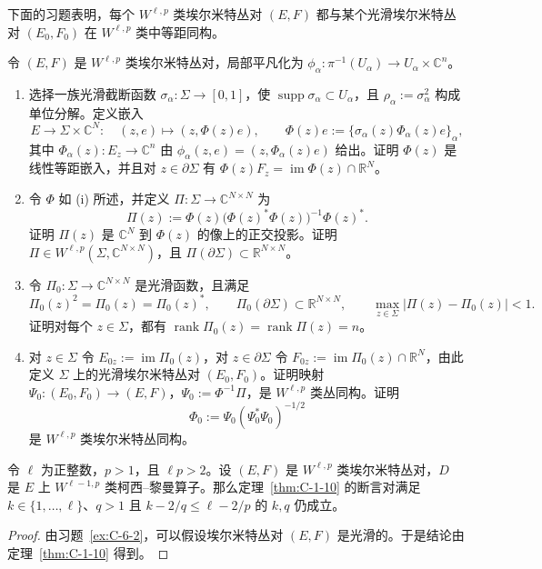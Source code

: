下面的习题表明，每个 $W^{\ell,p}$ 类埃尔米特丛对 $(E,F)$ 都与某个光滑埃尔米特丛对 $(E_0,F_0)$ 在 $W^{\ell,p}$ 类中等距同构。

\begin{exercise}[{$W^{\ell,p}$ 类丛}]\label{ex:C-6-2}
令 $(E,F)$ 是 $W^{\ell,p}$ 类埃尔米特丛对，局部平凡化为 $\phi_\alpha:\pi^{-1}(U_\alpha)\to U_\alpha\times\mathbb C^n$。
\begin{enumerate}[label=(\roman*)]
\item 选择一族光滑截断函数 $\sigma_\alpha:\Sigma\to[0,1]$，使 $\operatorname{supp}\sigma_\alpha\subset U_\alpha$，且 $\rho_\alpha:=\sigma_\alpha^2$ 构成单位分解。定义嵌入
\[
  E\longrightarrow\Sigma\times\mathbb C^N:\quad
  (z,e)\longmapsto(z,\Phi(z)e),\qquad
  \Phi(z)e:=\{\sigma_\alpha(z)\Phi_\alpha(z)e\}_\alpha,
\]
其中 $\Phi_\alpha(z):E_z\to\mathbb C^n$ 由 $\phi_\alpha(z,e)=(z,\Phi_\alpha(z)e)$ 给出。证明 $\Phi(z)$ 是线性等距嵌入，并且对 $z\in\partial\Sigma$ 有 $\Phi(z)F_z=\operatorname{im}\Phi(z)\cap\mathbb R^N$。
\item 令 $\Phi$ 如 (i) 所述，并定义 $\Pi:\Sigma\to\mathbb C^{N\times N}$ 为
\[
  \Pi(z):=\Phi(z)\bigl(\Phi(z)^*\Phi(z)\bigr)^{-1}\Phi(z)^*.
\]
证明 $\Pi(z)$ 是 $\mathbb C^N$ 到 $\Phi(z)$ 的像上的正交投影。证明 $\Pi\in W^{\ell,p}(\Sigma,\mathbb C^{N\times N})$，且 $\Pi(\partial\Sigma)\subset\mathbb R^{N\times N}$。
\item 令 $\Pi_0:\Sigma\to\mathbb C^{N\times N}$ 是光滑函数，且满足
\[
  \Pi_0(z)^2=\Pi_0(z)=\Pi_0(z)^*,\qquad
  \Pi_0(\partial\Sigma)\subset\mathbb R^{N\times N},\qquad
  \max_{z\in\Sigma}|\Pi(z)-\Pi_0(z)|<1.
\]
证明对每个 $z\in\Sigma$，都有 $\operatorname{rank}\Pi_0(z)=\operatorname{rank}\Pi(z)=n$。
\item 对 $z\in\Sigma$ 令 $E_{0z}:=\operatorname{im}\Pi_0(z)$，对 $z\in\partial\Sigma$ 令 $F_{0z}:=\operatorname{im}\Pi_0(z)\cap\mathbb R^N$，由此定义 $\Sigma$ 上的光滑埃尔米特丛对 $(E_0,F_0)$。证明映射 $\Psi_0:(E_0,F_0)\to(E,F)$，$\Psi_0:=\Phi^{-1}\Pi$，是 $W^{\ell,p}$ 类丛同构。证明
\[
  \Phi_0:=\Psi_0(\Psi_0^*\Psi_0)^{-1/2}
\]
是 $W^{\ell,p}$ 类埃尔米特丛同构。
\end{enumerate}
\end{exercise}

\begin{corollary}\label{cor:C-6-3}
令 $\ell$ 为正整数，$p>1$，且 $\ell p>2$。设 $(E,F)$ 是 $W^{\ell,p}$ 类埃尔米特丛对，$D$ 是 $E$ 上 $W^{\ell-1,p}$ 类柯西--黎曼算子。那么定理~\ref{thm:C-1-10} 的断言对满足 $k\in\{1,\ldots,\ell\}$、$q>1$ 且 $k-2/q\le\ell-2/p$ 的 $k,q$ 仍成立。
\end{corollary}
\begin{proof}
由习题~\ref{ex:C-6-2}，可以假设埃尔米特丛对 $(E,F)$ 是光滑的。于是结论由定理~\ref{thm:C-1-10} 得到。
\end{proof}
